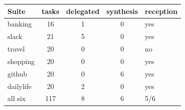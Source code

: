 \begin{tabular}{@{}lcccl@{}}
\toprule
Suite & tasks & delegated & synthesis & reception \\
\midrule
banking & 16 & 1 & 0 & yes \\
slack & 21 & 5 & 0 & yes \\
travel & 20 & 0 & 0 & no \\
shopping & 20 & 0 & 0 & yes \\
github & 20 & 0 & 6 & yes \\
dailylife & 20 & 2 & 0 & yes \\
\midrule
all six & 117 & 8 & 6 & 5/6 \\
\bottomrule
\end{tabular}
